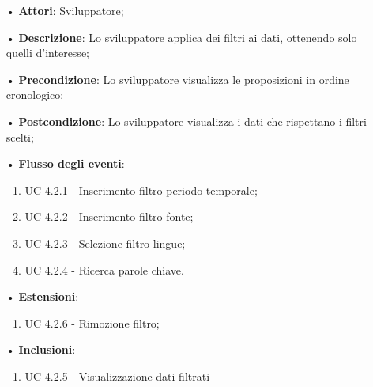 \begin{itemize}
\item[•]\textbf{Attori}: Sviluppatore;
\item[•]\textbf{Descrizione}: Lo sviluppatore applica dei filtri ai dati, ottenendo solo quelli d'interesse;
\item[•]\textbf{Precondizione}: Lo sviluppatore visualizza le proposizioni in ordine cronologico;
\item[•]\textbf{Postcondizione}: Lo sviluppatore visualizza i dati che rispettano i filtri scelti;
\item[•]\textbf{Flusso degli eventi}:
\begin{enumerate}
\item UC 4.2.1 - Inserimento filtro periodo temporale;
\item UC 4.2.2 - Inserimento filtro {fonte};
\item UC 4.2.3 - Selezione filtro lingue;
\item UC 4.2.4 - Ricerca parole chiave.
\end{enumerate}
\item[•]\textbf{Estensioni}:
\begin{enumerate}
	\item UC 4.2.6 - Rimozione filtro;
\end{enumerate}
\item[•]\textbf{Inclusioni}:
\begin{enumerate}
\item UC 4.2.5 - Visualizzazione dati filtrati
\end{enumerate}
\end{itemize}
